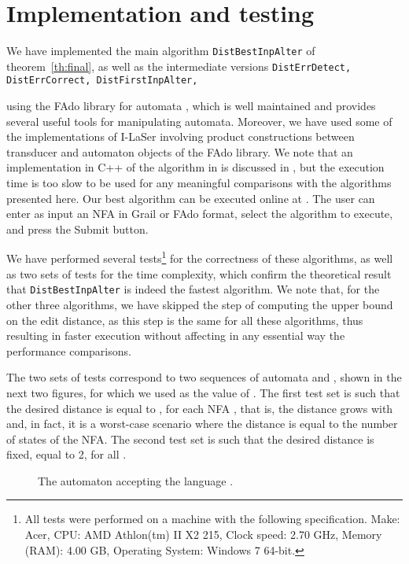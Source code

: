 \documentclass{article}
\theoremstyle{plain}
\theoremstyle{definition}
\theoremstyle{remark}
\newcommand\pssn{\par\smallskip\noindent}
\begin{document}
\section{Implementation and testing}\label{sec:implem}
We have implemented the main algorithm \texttt{DistBestInpAlter} of theorem~\ref{th:final}, as well as the intermediate versions
\pssi
\texttt{DistErrDetect, DistErrCorrect, DistFirstInpAlter,}
\pssn
using the FAdo library for automata
\cite{Fado}, which is well maintained and provides
several useful tools for manipulating automata.
Moreover, we have used some of the implementations
of I-LaSer \cite{ilaser} involving product constructions
between transducer and automaton objects of the FAdo
library. We note that an implementation in C++ of the
algorithm in \cite{Kon:2007} is discussed in
\cite{Daka:2011}, but the execution time is too slow
to be used for any meaningful comparisons with the algorithms
presented here. Our best algorithm can be executed online
at \cite{olaser}. The user can enter as input
an NFA in Grail or FAdo format, select the algorithm to execute,
and press the Submit button.

We have performed several
tests\footnote{All tests were performed on a machine with the
following specification.
  Make: Acer,
  CPU: AMD Athlon(tm) II X2 215,
  Clock speed: 2.70 GHz,
  Memory (RAM): 4.00 GB,
  Operating System: Windows 7 64-bit.}
for the correctness
of these algorithms, as well as two sets of tests for the time complexity, which confirm  the theoretical
result that \texttt{DistBestInpAlter}
is indeed the fastest algorithm. We note that, for the
other three algorithms, we have skipped the step of
computing the upper bound  on the edit distance,
as this step is the same for all these algorithms, thus
resulting in faster execution without affecting in any
essential way the performance comparisons.

The two sets of tests correspond to two sequences of
automata  and , shown in the next two figures, for which we used  as the value of .
The first test set is such that the desired distance is equal to , for each NFA , that is, the distance grows
with  and, in fact, it is a worst-case scenario where the
distance is equal to the number of states of the NFA.
The second test set is such that the desired distance is fixed, equal to 2,
for all .
\begin{figure}[ht]
\centering
{}
\parbox{4.3in}{\caption{The automaton  accepting the language .}\label{fig:testA}}
\end{figure}
\end{document}
